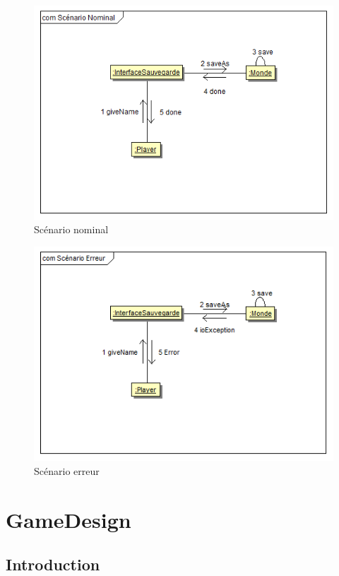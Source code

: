 \documentclass[a4paper]{report}
\begin{document}
\begin{figure}[htp]%
\includegraphics[width=\columnwidth]{img/spec/sauvegardeNominal}%
\caption{Scénario nominal}%
\label{}%
\end{figure}

\begin{figure}[htp]%
\includegraphics[width=\columnwidth]{img/spec/sauvegardeErreur}%
\caption{Scénario erreur}%
\label{}%
\end{figure}

\newpage
\part{GameDesign}
\vspace{0.2cm}

\chapter*{Introduction}
\end{document}
